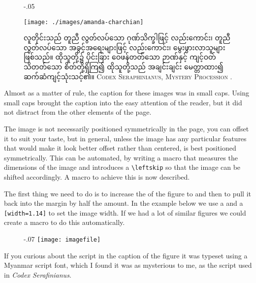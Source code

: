 \begin{figure}[htbp]
\leavevmode
\leftskip-.05\linewidth

\noindent\texttt{[image: ./images/amanda-charchian]}%
\par%

\linewidth

\noindent\lorem

\begin{center}
\ifdefined\myanmar
လူတိုင်းသည် တူညီ လွတ်လပ်သော ဂုဏ်သိက္ခါဖြင့် လည်းကောင်း၊ တူညီလွတ်လပ်သော အခွင့်အရေးများဖြင့် လည်းကောင်း၊ မွေးဖွားလာသူများ ဖြစ်သည်။ ထိုသူတို့၌ ပိုင်းခြား ဝေဖန်တတ်သော ဉာဏ်နှင့် ကျင့်ဝတ် သိတတ်သော စိတ်တို့ရှိကြ၍ ထိုသူတို့သည် အချင်းချင်း မေတ္တာထား၍ ဆက်ဆံကျင့်သုံးသင့်၏။
\fi
\protect\textsc{Codex Seraphinianus, Mystery Procession \protect\citep{seraphini}}.
\end{center}
\end{figure}

Almost as a matter of rule, the caption for these images was in small caps. Using small caps brought the caption into the easy attention of the reader, but it did not distract from the other elements of the page.

The image is not necessarily positioned symmetrically in the page, you can offset it to suit your taste, but in general, unless the image has any particular features that would make it look better offset rather than centered, is best positioned symmetrically. This can be automated, by writing a macro that measures the dimensions of the image and introduces a \verb+\leftskip+ so that the image can be shifted accordingly. A macro to achieve this is now described.


The first thing we need to do is to increase the \cmd{\textwidth} of the figure to and then to pull it back into
the margin by half the amount. In the example below we use a  and a \texttt{[width=1.14\string\textwidth]} to set the image width. If we had a lot of similar figures we could create a macro to do this automatically.

\begin{teXXX}
\begin{figure}[htbp]
\leftskip-.07%
   \textwidth\texttt{[image: imagefile]} \par
\end{figure}
\end{teXXX}

If you curious about the script in the caption of the figure it was typeset using a Myanmar script font, which I found it was as mysterious to me, as the script used in \textit{Codex Serafinianus}. 


\long{}






